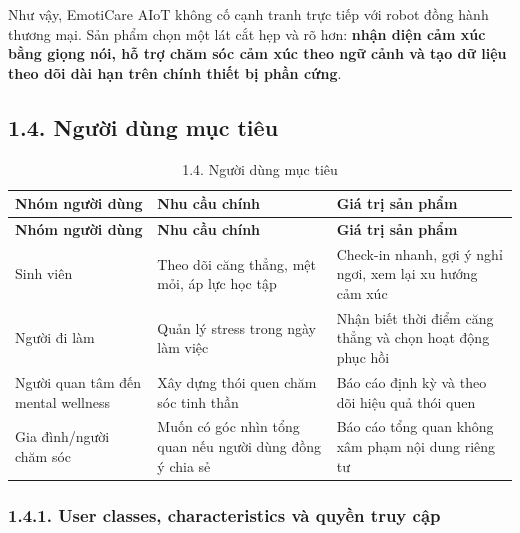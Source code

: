 \documentclass[12pt,a4paper]{article}
\begin{document}
Như vậy, EmotiCare AIoT không cố cạnh tranh trực tiếp với robot đồng hành thương mại. Sản phẩm chọn một lát cắt hẹp và rõ hơn: \textbf{nhận diện cảm xúc bằng giọng nói, hỗ trợ chăm sóc cảm xúc theo ngữ cảnh và tạo dữ liệu theo dõi dài hạn trên chính thiết bị phần cứng}.


\subsection*{1.4. Người dùng mục tiêu}

\begin{center}
\begin{longtable}{|P{0.25\textwidth}|P{0.32\textwidth}|P{0.33\textwidth}|}
\caption{1.4. Người dùng mục tiêu}\\
\hline
\textbf{Nhóm người dùng} & \textbf{Nhu cầu chính} & \textbf{Giá trị sản phẩm} \\
\hline
\endfirsthead
\hline
\textbf{Nhóm người dùng} & \textbf{Nhu cầu chính} & \textbf{Giá trị sản phẩm} \\
\hline
\endhead
Sinh viên & Theo dõi căng thẳng, mệt mỏi, áp lực học tập & Check-in nhanh, gợi ý nghỉ ngơi, xem lại xu hướng cảm xúc \\
\hline
Người đi làm & Quản lý stress trong ngày làm việc & Nhận biết thời điểm căng thẳng và chọn hoạt động phục hồi \\
\hline
Người quan tâm đến mental wellness & Xây dựng thói quen chăm sóc tinh thần & Báo cáo định kỳ và theo dõi hiệu quả thói quen \\
\hline
Gia đình/người chăm sóc & Muốn có góc nhìn tổng quan nếu người dùng đồng ý chia sẻ & Báo cáo tổng quan không xâm phạm nội dung riêng tư \\
\hline
\end{longtable}
\end{center}

\subsubsection*{1.4.1. User classes, characteristics và quyền truy cập}
\end{document}
